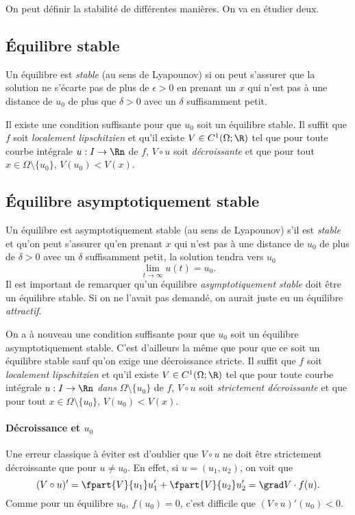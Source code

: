 On peut définir la stabilité de différentes manières.
On va en étudier deux.

\subsection{Équilibre stable}
Un équilibre est \emph{stable} (au sens de Lyapounov)
si on peut s'assurer que la
solution ne s'écarte pas de plus de $\epsilon>0$
en prenant un $x$ qui n'est pas
à une distance de $u_0$ de plus que $\delta>0$ avec un $\delta$
suffisamment petit.

Il existe une condition suffisante pour que $u_0$ soit un équilibre stable.
Il suffit que $f$ soit \emph{localement lipschitzien} et qu'il existe
$V \in C^1(\Omega;\R)$ tel que pour toute courbe intégrale $u:I\to\Rn$ de $f$,
$V \circ u$ soit \emph{décroissante} et
que pour tout $x\in\Omega\setminus\{u_0\}$,
$V(u_0) < V(x)$.

\subsection{Équilibre asymptotiquement stable}
Un équilibre est asymptotiquement stable (au sens de Lyapounov)
s'il est \emph{stable}
et qu'on peut s'assurer qu'en prenant $x$ qui n'est pas à une distance
de $u_0$ de plus de $\delta>0$ avec un $\delta$ suffisamment petit,
la solution tendra vers $u_0$
\[ \lim_{t\to\infty}u(t) = u_0. \]
Il est important de remarquer qu'un équilibre \emph{asymptotiquement stable}
doit être un équilibre stable.
Si on ne l'avait pas demandé, on aurait juste
eu un équilibre \emph{attractif}.

On a à nouveau une condition suffisante
pour que $u_0$ soit un équilibre asymptotiquement stable.
C'est d'ailleurs la même que pour que ce soit un équilibre stable
sauf qu'on exige une décroissance stricte.
Il suffit que $f$ soit \emph{localement lipschitzien} et qu'il existe
$V \in C^1(\Omega;\R)$ tel que pour toute courbe intégrale $u:I\to\Rn$
\emph{dans} $\Omega \setminus \{u_0\}$ de $f$,
$V \circ u$ soit \emph{strictement décroissante} et
que pour tout $x \in \Omega \setminus \{u_0\}$,
$V(u_0) < V(x)$.

\paragraph{Décroissance et $u_0$}
Une erreur classique à éviter est d'oublier que $V \circ u$ ne doit
être strictement décroissante que pour $u \neq u_0$.
En effet, si $u = (u_1,u_2)$, on voit que
\[ (V \circ u)' = \fpart{V}{u_1} u_1' + \fpart{V}{u_2} u_2' =
\grad V \cdot f(u). \]
Comme pour un équilibre $u_0$, $f(u_0) = 0$, c'est difficile que
$(V \circ u)'(u_0) < 0$.

